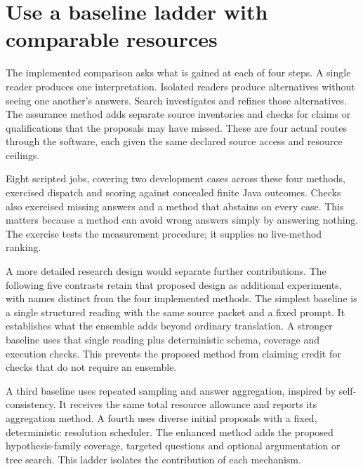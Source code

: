 \section{Use a baseline ladder with comparable resources}
\label{merge:M09:04}


The implemented comparison asks what is gained at each of four steps. A single
reader produces one interpretation. Isolated readers produce alternatives
without seeing one another's answers. Search investigates and refines those
alternatives. The assurance method adds separate source inventories and checks
for claims or qualifications that the proposals may have missed. These are four
actual routes through the software, each given the same declared source access
and resource ceilings.

Eight scripted jobs, covering two development cases across these four methods,
exercised dispatch and scoring against concealed finite Java outcomes. Checks
also exercised missing answers and a method that abstains on every case. This
matters because a method can avoid wrong answers simply by answering nothing.
The exercise tests the measurement procedure; it supplies no live-method ranking.

A more detailed research design would separate further contributions. The
following five contrasts retain that proposed design as additional experiments,
with names distinct from the four implemented methods. The simplest baseline
is a single structured reading with the same source packet
and a fixed prompt. It establishes what the ensemble adds beyond ordinary
translation. A stronger baseline uses that single reading plus deterministic
schema, coverage and execution checks. This prevents the proposed method from
claiming credit for checks that do not require an ensemble.

A third baseline uses repeated sampling and answer aggregation, inspired by
self-consistency. It receives the same total resource allowance and reports its
aggregation method. A fourth uses diverse initial proposals with a fixed,
deterministic resolution scheduler. The enhanced method adds the proposed
hypothesis-family coverage, targeted questions and optional argumentation or tree
search. This ladder isolates the contribution of each mechanism.

